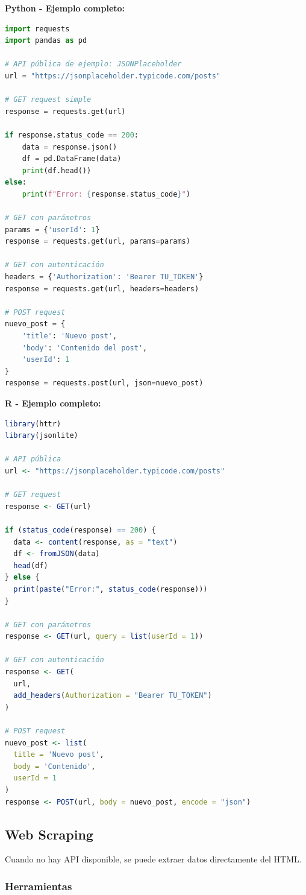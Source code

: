 \documentclass[a4paper,11pt]{article}
\begin{document}
\textbf{Python - Ejemplo completo:}
\begin{lstlisting}[language=Python]
import requests
import pandas as pd

# API pública de ejemplo: JSONPlaceholder
url = "https://jsonplaceholder.typicode.com/posts"

# GET request simple
response = requests.get(url)

if response.status_code == 200:
    data = response.json()
    df = pd.DataFrame(data)
    print(df.head())
else:
    print(f"Error: {response.status_code}")

# GET con parámetros
params = {'userId': 1}
response = requests.get(url, params=params)

# GET con autenticación
headers = {'Authorization': 'Bearer TU_TOKEN'}
response = requests.get(url, headers=headers)

# POST request
nuevo_post = {
    'title': 'Nuevo post',
    'body': 'Contenido del post',
    'userId': 1
}
response = requests.post(url, json=nuevo_post)
\end{lstlisting}

\textbf{R - Ejemplo completo:}
\begin{lstlisting}[language=R]
library(httr)
library(jsonlite)

# API pública
url <- "https://jsonplaceholder.typicode.com/posts"

# GET request
response <- GET(url)

if (status_code(response) == 200) {
  data <- content(response, as = "text")
  df <- fromJSON(data)
  head(df)
} else {
  print(paste("Error:", status_code(response)))
}

# GET con parámetros
response <- GET(url, query = list(userId = 1))

# GET con autenticación
response <- GET(
  url,
  add_headers(Authorization = "Bearer TU_TOKEN")
)

# POST request
nuevo_post <- list(
  title = 'Nuevo post',
  body = 'Contenido',
  userId = 1
)
response <- POST(url, body = nuevo_post, encode = "json")
\end{lstlisting}

\subsection{Web Scraping}

Cuando no hay API disponible, se puede extraer datos directamente del HTML.

\subsubsection{Herramientas}
\end{document}
